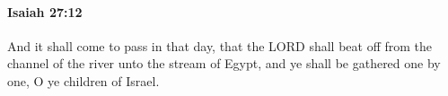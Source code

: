 
		\paragraph{Isaiah 27:12} %
			\label{ISAIAH-27-12}

			And it shall come to pass in that day, that the LORD shall beat off from the channel of the river unto the stream of Egypt, and ye shall be gathered one by one, O ye children of Israel.


